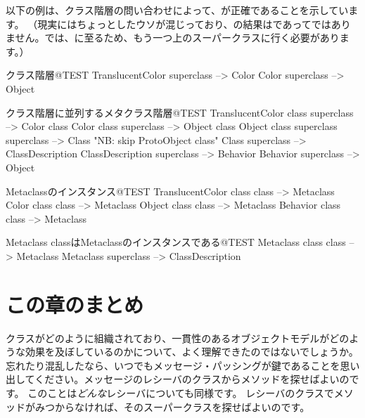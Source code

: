 \documentclass[a4paper,10pt,twoside]{book}
\begin{document}
以下の例は、クラス階層の問い合わせによって、が正確であることを示しています。
（現実にはちょっとしたウソが混じっており、の結果はであってではありません。\pharo では、に至るため、もう一つ上のスーパークラスに行く必要があります。）

\begin{example}{クラス階層}{@TEST}
TranslucentColor superclass --> Color
Color superclass                   --> Object
\end{example}

\begin{example}{クラス階層に並列するメタクラス階層}{@TEST}
TranslucentColor class superclass   --> Color class
Color class superclass                     --> Object class
Object class superclass superclass --> Class    "NB: skip ProtoObject class"
Class superclass                              --> ClassDescription
ClassDescription superclass            --> Behavior
Behavior superclass                         --> Object
\end{example}

\begin{example}{Metaclassのインスタンス}{@TEST}
TranslucentColor class class --> Metaclass
Color class class                   --> Metaclass
Object class class                 --> Metaclass
Behavior class class              --> Metaclass
\end{example}
\begin{example}{Metaclass classはMetaclassのインスタンスである}{@TEST}
Metaclass class class --> Metaclass
Metaclass superclass --> ClassDescription
\end{example}

\section{この章のまとめ}
クラスがどのように組織されており、一貫性のあるオブジェクトモデルがどのような効果を及ぼしているのかについて、よく理解できたのではないでしょうか。忘れたり混乱したなら、いつでもメッセージ・パッシングが鍵であることを思い出してください。メッセージのレシーバのクラスからメソッドを探せばよいのです。
このことは\emph{どんな}レシーバについても同様です。
レシーバのクラスでメソッドがみつからなければ、そのスーパークラスを探せばよいのです。
\end{document}
